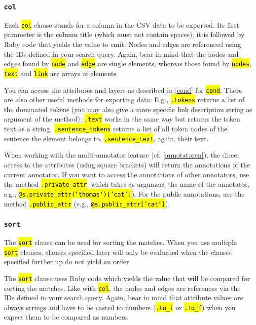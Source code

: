 \documentclass[12pt]{scrartcl}
\newcommand{\code}[1]{\hl{\texttt{#1}}}
\begin{document}
\subsubsection{\texttt{col}}

Each \code{col} clause stands for a column in the CSV data to be exported.
Its first parameter is the column title (which must not contain spaces); it is followed by Ruby code that yields the value to emit.
Nodes and edges are referenced using the IDs defined in your search query.
Again, bear in mind that the nodes and edges found by \code{node} and \code{edge} are single elements, whereas those found by \code{nodes}, \code{text} and \code{link} are arrays of elements.

You can access the attributes and layers as described in \ref{cond} for \code{cond}.
There are also other useful methods for exporting data:
E.g., \code{.tokens} returns a list of the dominated tokens (you may also give a more specific link description string as argument of the method); \code{.text} works in the same way but returns the token text as a string.
\code{.sentence\_tokens} returns a list of all token nodes of the sentence the element belongs to, \code{.sentence\_text}, again, their text.

When working with the multi-annotator feature (cf. \ref{annotatoren}), the direct access to the attributes (using square brackets) will return the annotations of the current annotator.
If you want to access the annotations of other annotators, use the method \mbox{\code{.private\_attr}}, which takes as argument the name of the annotator,\\e.g., \code{@s.private\_attr('thomas')['cat']}).
For the public annotations, use the method \code{.public\_attr} (e.g., \code{@s.public\_attr['cat']}).


\subsubsection{\texttt{sort}}

The \code{sort} clause can be used for sorting the matches.
When you use multiple \code{sort} clauses, clauses specified later will only be evaluated when the clauses specified further up do not yield an order.

The \code{sort} clause uses Ruby code which yields the value that will be compared for sorting the matches.
Like with \code{col}, the nodes and edges are references via the IDs defined in your search query.
Again, bear in mind that attribute values are always strings and have to be casted to numbers (\code{.to\_i} or \code{.to\_f}) when you expect them to be compared as numbers.
\end{document}
